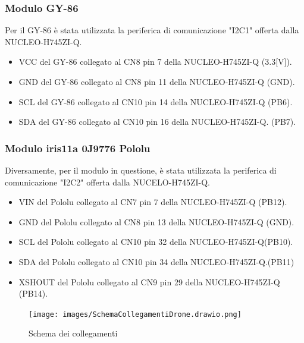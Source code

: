 \subsubsection{Modulo GY-86}
Per il GY-86 è stata utilizzata la periferica di comunicazione "I2C1" offerta dalla NUCLEO-H745ZI-Q.
\begin{itemize}
\item VCC del GY-86 collegato al CN8 pin 7   della NUCLEO-H745ZI-Q (3.3[V]).
\item GND del GY-86 collegato al CN8 pin 11  della NUCLEO-H745ZI-Q (GND).
\item SCL del GY-86 collegato al CN10 pin 14 della NUCLEO-H745ZI-Q (PB6).
\item SDA del GY-86 collegato al CN10 pin 16 della NUCLEO-H745ZI-Q. (PB7).
\end{itemize}
\subsubsection{Modulo iris11a 0J9776 Pololu}
Diversamente, per il modulo in questione, è stata utilizzata la periferica di comunicazione "I2C2" offerta dalla NUCELO-H745ZI-Q.
\begin{itemize}
\item VIN del Pololu collegato al CN7 pin 7   della NUCLEO-H745ZI-Q (PB12).
\item GND del Pololu collegato al CN8 pin 13  della NUCLEO-H745ZI-Q (GND).
\item SCL del Pololu collegato al CN10 pin 32 della NUCLEO-H745ZI-Q(PB10).
\item SDA del Pololu collegato al CN10 pin 34 della NUCLEO-H745ZI-Q.(PB11)
\item XSHOUT del Pololu collegato al CN9 pin 29 della NUCLEO-H745ZI-Q (PB14).
\end{itemize}

\begin{figure}[H]
    \centering
    \texttt{[image: images/SchemaCollegamentiDrone.drawio.png]}
    \caption{Schema dei collegamenti}
    \label{fig:schema}
    \end{figure}
